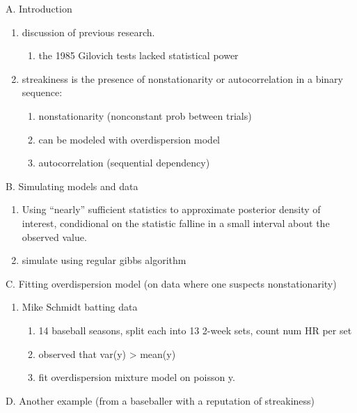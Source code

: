 \documentclass[12pt,twoside]{dukestatscithesis}
\providecommand{\tightlist}{%
  \setlength{\itemsep}{0pt}\setlength{\parskip}{0pt}}
\theoremstyle{definition}
\theoremstyle{definition}
\theoremstyle{definition}
\theoremstyle{remark}
\begin{document}
A. Introduction
\begin{enumerate}
\def\labelenumi{\arabic{enumi}.}
\tightlist
\item
  discussion of previous research.
  \begin{enumerate}
  \def\labelenumii{\alph{enumii}.}
  \tightlist
  \item
    the 1985 Gilovich tests lacked statistical power
  \end{enumerate}
\item
  streakiness is the presence of nonstationarity or autocorrelation in a
  binary sequence:
  \begin{enumerate}
  \def\labelenumii{\alph{enumii}.}
  \tightlist
  \item
    nonstationarity (nonconstant prob between trials)
  \item
    can be modeled with overdispersion model
  \item
    autocorrelation (sequential dependency)
  \end{enumerate}
\end{enumerate}
B. Simulating models and data
\begin{enumerate}
\def\labelenumi{\arabic{enumi}.}
\tightlist
\item
  Using ``nearly'' sufficient statistics to approximate posterior
  density of interest, condidional on the statistic falline in a small
  interval about the observed value.
\item
  simulate using regular gibbs algorithm
\end{enumerate}
C. Fitting overdispersion model (on data where one suspects
nonstationarity)
\begin{enumerate}
\def\labelenumi{\arabic{enumi}.}
\tightlist
\item
  Mike Schmidt batting data
  \begin{enumerate}
  \def\labelenumii{\alph{enumii}.}
  \tightlist
  \item
    14 baseball seasons, split each into 13 2-week sets, count num HR
    per set
  \item
    observed that var(y) \textgreater{} mean(y)
  \item
    fit overdispersion mixture model on poisson y.
  \end{enumerate}
\end{enumerate}
D. Another example (from a baseballer with a reputation of streakiness)
\end{document}
